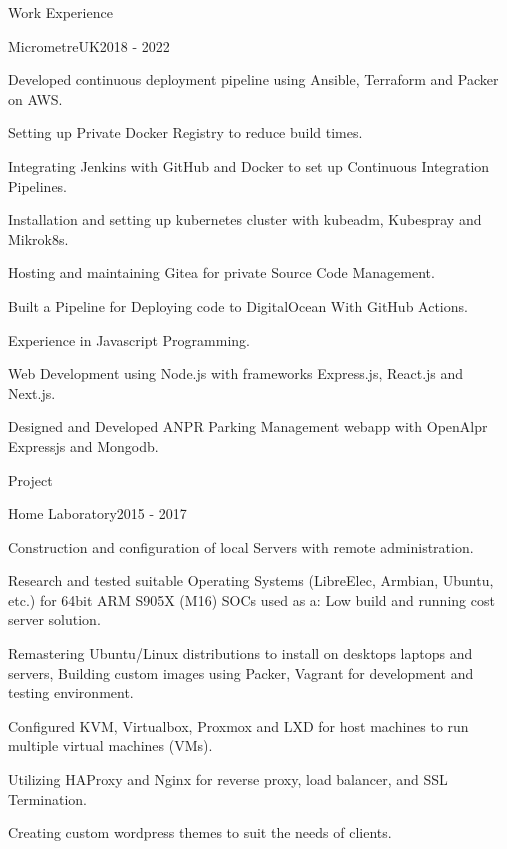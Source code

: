 \documentclass{cover}
\begin{document}
\begin{rSection}{Work Experience}
\begin{rSubsection}{MicrometreUK}{2018 - 2022}{}

\item Developed continuous deployment pipeline using Ansible, Terraform and Packer on AWS. 
\item Setting up Private Docker Registry  to reduce build times.  
\item Integrating Jenkins with GitHub and Docker to set up Continuous Integration Pipelines.
\item Installation and setting up kubernetes cluster with kubeadm, Kubespray and Mikrok8s. 
\item Hosting and maintaining Gitea for private Source Code Management.
\item Built a Pipeline for  Deploying code to DigitalOcean With GitHub Actions.
\item Experience in Javascript Programming.
\item Web Development using Node.js with frameworks Express.js, React.js and Next.js.
\item Designed and Developed ANPR Parking Management webapp with OpenAlpr Expressjs and Mongodb.
\end{rSubsection}
\end{rSection}

\begin{rSection}{Project}
\begin{rSubsection}{Home Laboratory}{2015 - 2017}{}

\item Construction and configuration of local Servers with remote administration.
\item Research and tested suitable Operating Systems (LibreElec, Armbian, Ubuntu,
etc.) for 64bit ARM S905X (M16) SOCs used as a: Low build and running cost
server solution.
\item Remastering Ubuntu/Linux distributions to install on desktops laptops and
servers, Building custom images using Packer, Vagrant for development and
testing environment.
\item Configured KVM, Virtualbox, Proxmox and LXD for host machines to run
multiple virtual machines (VMs).
\item Utilizing HAProxy and Nginx for reverse proxy, load balancer, and SSL Termination.
\item Creating custom wordpress themes to suit the needs of clients.
\end{rSubsection}
\end{rSection}
\end{document}

